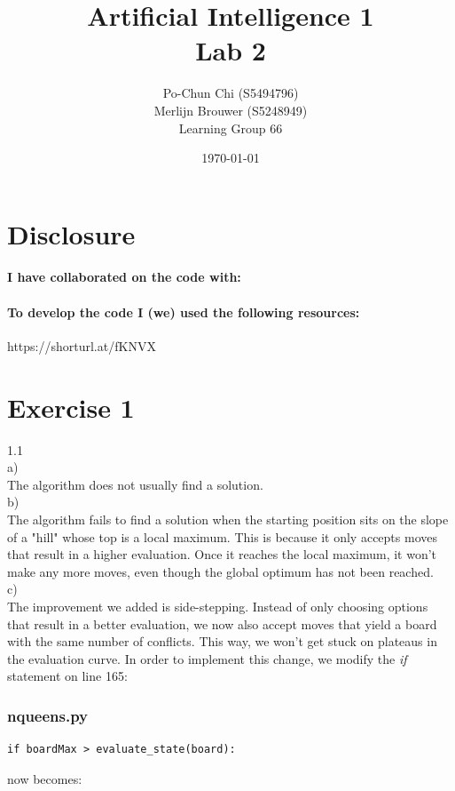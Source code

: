 \documentclass{article}
\title{{\bf Artificial Intelligence 1} \\ Lab 2}%
\author{
Po-Chun Chi (S5494796)
\\
Merlijn Brouwer (S5248949)
\\
Learning Group 66
} %
\date{\today}
\begin{document}
\maketitle

\section*{Disclosure}

\paragraph{I have collaborated on the code with:} 
\paragraph{To develop the code I (we) used the following resources:\\
} %
https://shorturl.at/fKNVX

\section*{Exercise 1}
1.1
\\
a)
\\
The algorithm does not usually find a solution.
\\
b)
\\
The algorithm fails to find a solution when the starting position sits on the slope of a "hill" whose top is a local maximum. This is because it only accepts moves that result in a higher evaluation. Once it reaches the local maximum, it won't make any more moves, even though the global optimum has not been reached.
\\
c)
\\
The improvement we added is side-stepping. Instead of only choosing options that result in a better evaluation, we now also accept moves that yield a board with the same number of conflicts. This way, we won't get stuck on plateaus in the evaluation curve. In order to implement this change, we modify the \emph{if} statement on line 165:
\subsubsection*{nqueens.py}
\begin{lstlisting}
if boardMax > evaluate_state(board):
\end{lstlisting}
now becomes:
\end{document}
